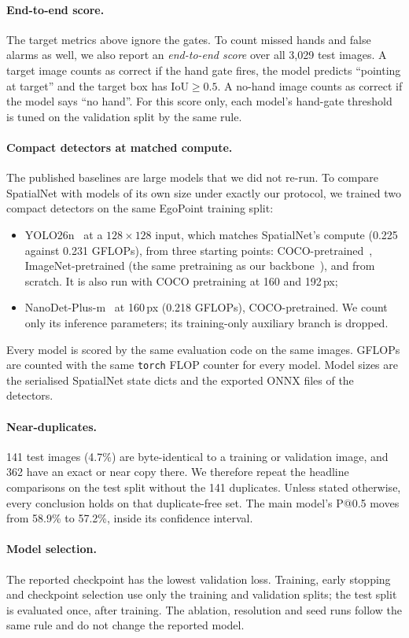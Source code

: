 \paragraph{End-to-end score.} The target metrics above ignore the gates. To count missed hands and false alarms as well, we also report an \emph{end-to-end score} over all 3,029 test images. A target image counts as correct if the hand gate fires, the model predicts ``pointing at target'' and the target box has IoU${\geq}0.5$. A no-hand image counts as correct if the model says ``no hand''. For this score only, each model's hand-gate threshold is tuned on the validation split by the same rule.

\paragraph{Compact detectors at matched compute.} The published baselines are large models that we did not re-run. To compare SpatialNet with models of its own size under exactly our protocol, we trained two compact detectors on the same EgoPoint training split:
\begin{itemize}
\item YOLO26n~\cite{ultralytics2026yolo26} at a $128\times128$ input, which matches SpatialNet's compute (0.225 against 0.231 GFLOPs), from three starting points: COCO-pretrained~\cite{lin2014coco}, ImageNet-pretrained (the same pretraining as our backbone~\cite{deng2009imagenet}), and from scratch. It is also run with COCO pretraining at 160 and 192\,px;
\item NanoDet-Plus-m~\cite{rangilyu2021nanodet} at 160\,px (0.218 GFLOPs), COCO-pretrained. We count only its inference parameters; its training-only auxiliary branch is dropped.
\end{itemize}
 Every model is scored by the same evaluation code on the same images. GFLOPs are counted with the same \texttt{torch} FLOP counter for every model. Model sizes are the serialised SpatialNet state dicts and the exported ONNX files of the detectors.

\paragraph{Near-duplicates.} 141 test images (4.7\%) are byte-identical to a training or validation image, and 362 have an exact or near copy there. We therefore repeat the headline comparisons on the test split without the 141 duplicates. Unless stated otherwise, every conclusion holds on that duplicate-free set. The main model's P@0.5 moves from 58.9\% to 57.2\%, inside its confidence interval.

\paragraph{Model selection.} The reported checkpoint has the lowest validation loss. Training, early stopping and checkpoint selection use only the training and validation splits; the test split is evaluated once, after training. The ablation, resolution and seed runs follow the same rule and do not change the reported model.
